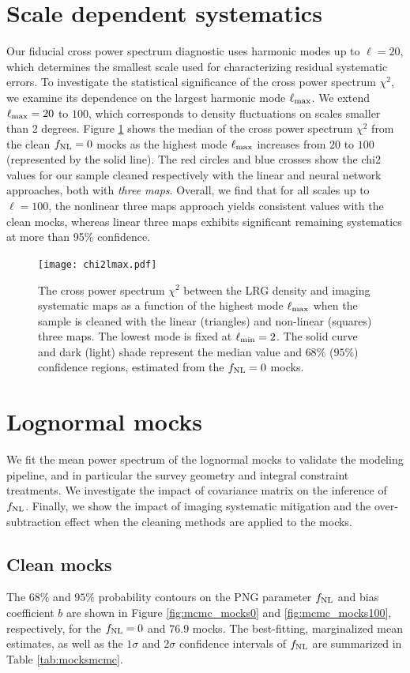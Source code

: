 \section{Scale dependent systematics}\label{sec:scalesys}
Our fiducial cross power spectrum diagnostic uses harmonic modes up to $\ell=20$, which determines the smallest scale used for characterizing residual systematic errors. To investigate the statistical significance of the cross power spectrum $\chi^{2}$, we examine its dependence on the largest harmonic mode $\ell_{\rm max}$. We extend $\ell_{\rm max}=20$ to $100$, which corresponds to density fluctuations on scales smaller than $2$ degrees. Figure \ref{fig:chi2cellextend} shows the median of the cross power spectrum $\chi^{2}$ from the clean $f_{\rm NL}=0$ mocks as the highest mode $\ell_{\rm max}$ increases from $20$ to $100$ (represented by the solid line). The red circles and blue crosses show the chi2 values for our sample cleaned respectively with the linear and neural network approaches, both with \textit{three maps}. Overall, we find that for all scales up to $\ell=100$, the nonlinear three maps approach yields consistent values with the clean mocks, whereas linear three maps exhibits significant remaining systematics at more than 95\% confidence.

\begin{figure}
\centering
\texttt{[image: chi2lmax.pdf]}
\caption{The cross power spectrum $\chi^{2}$ between the LRG density and imaging systematic maps as a function of the highest mode $\ell_{\rm max}$ when the sample is cleaned with the linear (triangles) and non-linear (squares) three maps. The lowest mode is fixed at $\ell_{\rm min}=2$. The solid curve and dark (light) shade represent the median value and $68\%$ ($95\%$) confidence regions, estimated from the $f_{\rm NL}=0$ mocks.}\label{fig:chi2cellextend}
\end{figure}

\section{Lognormal mocks}
We fit the mean power spectrum of the lognormal mocks to validate the modeling pipeline, and in particular the survey geometry and integral constraint treatments. We investigate the impact of covariance matrix on the inference of $f_{\rm NL}$. Finally, we show the impact of imaging systematic mitigation and the over-subtraction effect when the cleaning methods are applied to the mocks. 

\subsection{Clean mocks}
The $68\%$ and $95\%$ probability contours on the PNG parameter $f_{\rm NL}$ and bias coefficient $b$ are shown in Figure \ref{fig:mcmc_mocks0} and \ref{fig:mcmc_mocks100}, respectively, for the $f_{\rm NL}=0$ and 76.9 mocks. The best-fitting, marginalized mean estimates, as well as the $1\sigma$ and $2\sigma$ confidence intervals of $f_{\rm NL}$ are summarized in Table \ref{tab:mocksmcmc}. 



